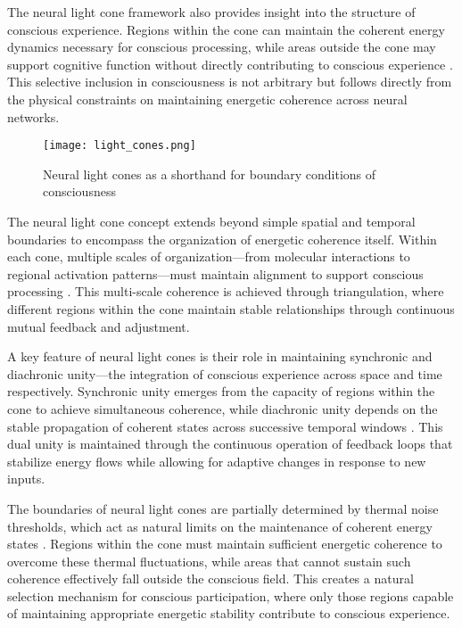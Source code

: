 The neural light cone framework also provides insight into the structure of conscious experience. Regions within the cone can maintain the coherent energy dynamics necessary for conscious processing, while areas outside the cone may support cognitive function without directly contributing to conscious experience \cite{zylberberg2010brain}. This selective inclusion in consciousness is not arbitrary but follows directly from the physical constraints on maintaining energetic coherence across neural networks.

\begin{figure}[h]
    \centering
    \texttt{[image: light\_cones.png]}

    \caption{Neural light cones as a shorthand for boundary conditions of consciousness}
\end{figure}

The neural light cone concept extends beyond simple spatial and temporal boundaries to encompass the organization of energetic coherence itself. Within each cone, multiple scales of organization—from molecular interactions to regional activation patterns—must maintain alignment to support conscious processing \cite{vazquez2019gradients}. This multi-scale coherence is achieved through triangulation, where different regions within the cone maintain stable relationships through continuous mutual feedback and adjustment.

A key feature of neural light cones is their role in maintaining synchronic and diachronic unity—the integration of conscious experience across space and time respectively. Synchronic unity emerges from the capacity of regions within the cone to achieve simultaneous coherence, while diachronic unity depends on the stable propagation of coherent states across successive temporal windows \cite{tegmark2016improved}. This dual unity is maintained through the continuous operation of feedback loops that stabilize energy flows while allowing for adaptive changes in response to new inputs.

The boundaries of neural light cones are partially determined by thermal noise thresholds, which act as natural limits on the maintenance of coherent energy states \cite{oyama2009noise}. Regions within the cone must maintain sufficient energetic coherence to overcome these thermal fluctuations, while areas that cannot sustain such coherence effectively fall outside the conscious field. This creates a natural selection mechanism for conscious participation, where only those regions capable of maintaining appropriate energetic stability contribute to conscious experience.

